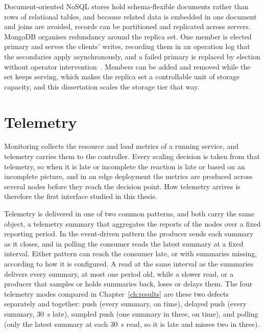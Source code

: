 ﻿\documentclass[12pt,reqno,twoside]{amsbook}
\begin{document}
Document-oriented NoSQL stores hold schema-flexible documents rather than rows of
relational tables, and because related data is embedded in one document and joins
are avoided, records can be partitioned and replicated across servers. MongoDB
organises redundancy around the replica set. One member is elected primary and
serves the clients' writes, recording them in an operation log that the
secondaries apply asynchronously, and a failed primary is replaced by election
without operator intervention~\parencite{MongoDBDocsReplicaSet}. Members can be
added and removed while the set keeps serving, which makes the replica set a
controllable unit of storage capacity, and this dissertation scales the storage
tier that way.

\section{Telemetry}\label{sec:lit_monitoring} %
Monitoring collects the resource and load metrics of a running service, and
telemetry carries them to the controller. Every scaling decision is taken from
that telemetry, so when it is late or incomplete the reaction is late or based
on an incomplete picture, and in an edge deployment the metrics are produced
across several nodes before they reach the decision point. How telemetry arrives
is therefore the first interface studied in this thesis.

Telemetry is delivered in one of two common patterns, and both carry the
same object, a telemetry summary that aggregates the reports of the nodes over
a fixed reporting period. In the event-driven pattern the producer sends each
summary as it closes, and in polling the consumer reads the latest summary at a
fixed interval. Either pattern can reach the consumer late, or with summaries
missing, according to how it is configured. A read at the same interval as the
summaries delivers every summary, at most one period old, while a slower read,
or a producer that samples or holds summaries back, loses or delays them. The four telemetry modes compared in
Chapter~\ref{ch:results} are these two defects separately and together: push
(every summary, on time), delayed push (every summary, 30~s late), sampled
push (one summary in three, on time), and polling (only the latest summary at
each 30~s read, so it is late and misses two in three).
\end{document}
